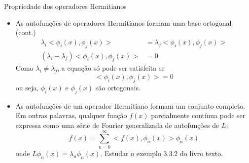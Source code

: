   \begin{slide}[toc=]{Propriedade dos operadores Hermitianos}
	   \begin{itemize}
		   \item As autofunções de operadores Hermitianos formam uma base ortogonal (cont.)
			   \begin{align*}
				   \lambda_i<\phi_i(x),\phi_j(x)> & =\lambda_j<\phi_i(x),\phi_j(x)>\\
				   (\lambda_i - \lambda_j)<\phi_i(x),\phi_j(x)> &= 0
			   \end{align*}
			   Como $\lambda_i\neq\lambda_j$, a equação só pode ser satisfeita se 
			   \begin{equation*}
				   <\phi_i(x),\phi_j(x)> = 0
			   \end{equation*}
			   ou seja, $\phi_i(x)$ e $\phi_j(x)$ são ortogonais.
		   \item As autofunções de um operador Hermitiano formam um conjunto completo.\\ Em outras palavras, qualquer função $f(x)$ parcialmente contínua pode ser expressa como uma série de Fourier generalizada de autofunções de $L$:
			   \begin{equation*}
				   f(x) = \sum_{n=0}^\infty <f(x),\phi_n(x)>\phi_n(x)
			   \end{equation*}
			   onde $L\phi_n(x) = \lambda_n\phi_n(x)$.
			   Estudar o exemplo 3.3.2 do livro texto.
	   \end{itemize}
   \end{slide}
	

